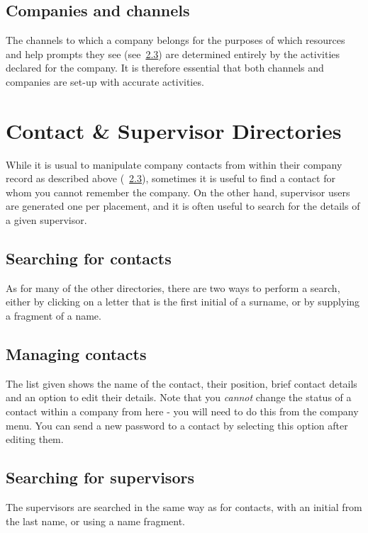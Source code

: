 \documentclass[12 pt]{book}
\begin{document}
\section{Companies and channels}

The channels to which a company belongs for the purposes of which resources
and help prompts they see (see~\ref{}) are determined entirely by the
activities declared for the company. It is therefore essential that both
channels and companies are set-up with accurate activities.

%
%
%

\chapter{Contact \& Supervisor Directories}

While it is usual to manipulate company contacts from within their company record as described above
(~\ref{}), sometimes it is useful to find a contact for whom you cannot remember the company. On the
other hand, supervisor users are generated one per placement, and it is often useful to search for
the details of a given supervisor.

\section{Searching for contacts}

As for many of the other directories, there are two ways to perform a search, either by clicking on
a letter that is the first initial of a surname, or by supplying a fragment of a name.

\section{Managing contacts}

The list given shows the name of the contact, their position, brief contact details and an option to
edit their details. Note that you \emph{cannot} change the status of a contact within a company
from here - you will need to do this from the company menu. You can send a new password to a contact
by selecting this option after editing them.

\section{Searching for supervisors}

The supervisors are searched in the same way as for contacts, with an initial from the last name,
or using a name fragment.
\end{document}
